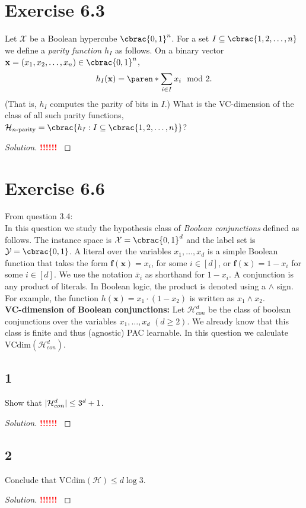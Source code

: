 \documentclass[10pt, a4paper, twoside]{amsart}
\DeclarePairedDelimiter\abs{\lvert}{\rvert}
\DeclarePairedDelimiter\cbrac\{\}
\DeclarePairedDelimiter\paren()
\newcommand{\cH}{\ensuremath{\mathcal{H}}}
\newcommand{\cX}{\ensuremath{\mathcal{X}}}
\newenvironment{solution}
               {\let\oldqedsymbol=\qedsymbol
                \renewcommand{\qedsymbol}{$\blacktriangleleft$}
                \begin{proof}[Solution]}
               {\end{proof}
                \renewcommand{\qedsymbol}{\oldqedsymbol}}
\newcommand{\TODO}{\textcolor{red}{\textbf{!!!!!! }}}
\begin{document}
\section*{Exercise 6.3}
Let $\cX$ be a Boolean hypercube $\cbrac{0,1}^n$. For a set $I \subseteq \cbrac{1,2,\ldots ,n}$ we define a \textit{parity function $h_I$} as follows. On a binary vector $\mathbf{x} = (x_1,x_2,\ldots ,x_n) \in \cbrac{0,1}^n$,
\begin{equation*}
  h_I(\mathbf{x}) = \paren*{\sum_{i \in I}x_i} \mod 2.
\end{equation*}
(That is, $h_I$ computes the parity of bits in $I$.) What is the VC-dimension of the class of all such parity functions, $\cH_{n\text{-parity}} = \cbrac{h_I:I \subseteq \cbrac{1,2, \dots ,n}}$?
\begin{solution}
\TODO
\end{solution}
\section*{Exercise 6.6}
From question 3.4: \\
In this question we study the hypothesis class of \textit{Boolean conjunctions} defined as follows. The instance space is $\cX = \cbrac{0,1}^d$ and the label set is $\mathcal{Y}=\cbrac{0,1}$. A literal over the variables $x_1, \ldots ,x_d$ is a simple Boolean function that takes the form $\mathbf{f}(\mathbf{x}) = x_i$, for some $i \in [d]$, or $\mathbf{f}(\mathbf{x}) = 1-x_i$ for some $i \in [d]$. We use the notation $\bar{x}_i$ as shorthand for $1-x_i$. A conjunction is any product of literals. In Boolean logic, the product is denoted using a $\land$ sign. For example, the function $h(\mathbf{x}) = x_1 \cdot (1-x_2)$ is written as $x_1 \land x_2$.\\
\textbf{VC-dimension of Boolean conjunctions:} Let $\cH^d_{con}$ be the class of boolean conjunctions over the variables $x_1, \ldots , x_d$ $(d \geq 2)$. We already know that this class is finite and thus (agnostic) PAC learnable. In this question we calculate $\text{VCdim}(\cH^d_{con})$.
\subsection*{1}
Show that $\abs{\cH^d_{con}} \leq 3^d + 1$.
\begin{solution}
\TODO
\end{solution}
\subsection*{2}
Conclude that $\text{VCdim}(\cH) \leq d \log 3$.
\begin{solution}
\TODO
\end{solution}
\end{document}
